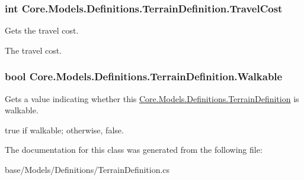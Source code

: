 \subsubsection[{Travel\+Cost}]{\setlength{\rightskip}{0pt plus 5cm}int Core.\+Models.\+Definitions.\+Terrain\+Definition.\+Travel\+Cost\hspace{0.3cm}{\ttfamily [get]}}\label{classCore_1_1Models_1_1Definitions_1_1TerrainDefinition_aa1f619459353eedfb36c657b0eb370e7}


Gets the travel cost. 

The travel cost.\hypertarget{classCore_1_1Models_1_1Definitions_1_1TerrainDefinition_a6811c8cb478e3c2cbbab24fbbd746e16}{}
\subsubsection[{Walkable}]{\setlength{\rightskip}{0pt plus 5cm}bool Core.\+Models.\+Definitions.\+Terrain\+Definition.\+Walkable\hspace{0.3cm}{\ttfamily [get]}}\label{classCore_1_1Models_1_1Definitions_1_1TerrainDefinition_a6811c8cb478e3c2cbbab24fbbd746e16}


Gets a value indicating whether this \hyperlink{classCore_1_1Models_1_1Definitions_1_1TerrainDefinition}{Core.\+Models.\+Definitions.\+Terrain\+Definition} is walkable. 

{\ttfamily true} if walkable; otherwise, {\ttfamily false}.

The documentation for this class was generated from the following file\+:\begin{DoxyCompactItemize}
\item 
base/\+Models/\+Definitions/Terrain\+Definition.\+cs\end{DoxyCompactItemize}
